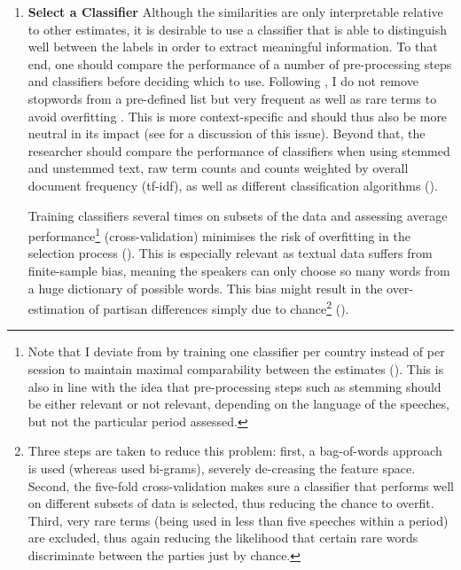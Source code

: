 \documentclass{article}
\begin{document}
\begin{enumerate}
    \item \textbf{Select a Classifier} \newline Although the similarities are only interpretable relative to other estimates, it is desirable to use a classifier that is able to distinguish well between the labels in order to extract meaningful information. To that end, one should compare the performance of a number of pre-processing steps and classifiers before deciding which to use. Following \citeauthor{Peterson2018}, I do not remove stopwords from a pre-defined list but very frequent as well as rare terms to avoid overfitting \citeyear{Peterson2018}. This is more context-specific and should thus also be more neutral in its impact (see \cite{Schoonvelde2019a} for a discussion of this issue). Beyond that, the researcher should compare the performance of classifiers when using stemmed and unstemmed text, raw term counts and counts weighted by overall document frequency (tf-idf), as well as different classification algorithms (\cite{Denny2018}).\par 
    Training classifiers several times on subsets of the data and assessing average performance\footnote{Note that I deviate from \citeauthor{Peterson2018} by training one classifier per country instead of per session to maintain maximal comparability between the estimates (\citeyear{Peterson2018}). This is also in line with the idea that pre-processing steps such as stemming should be either relevant or not relevant, depending on the language of the speeches, but not the particular period assessed.} (cross-validation) minimises the risk of overfitting in the selection process (\cite{Breiman1989}). This is especially relevant as textual data suffers from finite-sample bias, meaning the speakers can only choose so many words from a huge dictionary of possible words. This bias might result in the over-estimation of partisan differences simply due to chance\footnote{Three steps are taken to reduce this problem: first, a bag-of-words approach is used (whereas \citeauthor{Gentzkow2019} used bi-grams), severely de-creasing the feature space. Second, the five-fold cross-validation makes sure a classifier that performs well on different subsets of data is selected, thus reducing the chance to overfit. Third, very rare terms (being used in less than five speeches within a period) are excluded, thus again reducing the likelihood that certain rare words discriminate between the parties just by chance.} (\cite{Gentzkow2019}).  \par

\end{enumerate}
\end{document}
